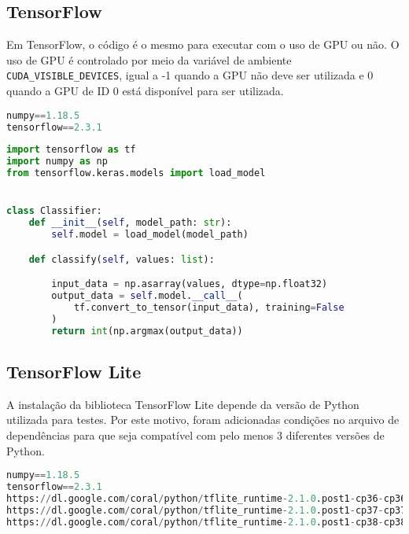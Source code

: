 \subsection{TensorFlow}

Em TensorFlow, o código é o mesmo para executar com o uso de GPU ou não. O uso de GPU é controlado por meio da variável de ambiente \texttt{CUDA\_VISIBLE\_DEVICES}, igual a -1 quando a GPU não deve ser utilizada e 0 quando a GPU de ID 0 está disponível para ser utilizada.

\begin{lstlisting}[language=Python, caption=Dependências PIP para uso de TensorFlow]
numpy==1.18.5
tensorflow==2.3.1
\end{lstlisting}

\begin{lstlisting}[language=Python, caption=Classificador implementado em Python utilizando TensorFlow]
import tensorflow as tf
import numpy as np
from tensorflow.keras.models import load_model


class Classifier:
    def __init__(self, model_path: str):
        self.model = load_model(model_path)

    def classify(self, values: list):

        input_data = np.asarray(values, dtype=np.float32)
        output_data = self.model.__call__(
            tf.convert_to_tensor(input_data), training=False
        )
        return int(np.argmax(output_data))
\end{lstlisting}

\subsection{TensorFlow Lite}

A instalação da biblioteca TensorFlow Lite depende da versão de Python utilizada para testes. Por este motivo, foram adicionadas condições no arquivo de dependências para que seja compatível com pelo menos 3 diferentes versões de Python.

\begin{lstlisting}[language=Python, caption=Dependências PIP para uso de TensorFlow Lite sem GPU]
numpy==1.18.5
tensorflow==2.3.1
https://dl.google.com/coral/python/tflite_runtime-2.1.0.post1-cp36-cp36m-linux_x86_64.whl ; python_version == '3.6'
https://dl.google.com/coral/python/tflite_runtime-2.1.0.post1-cp37-cp37m-linux_x86_64.whl ; python_version == '3.7'
https://dl.google.com/coral/python/tflite_runtime-2.1.0.post1-cp38-cp38-linux_x86_64.whl ; python_version == '3.8'
\end{lstlisting}

